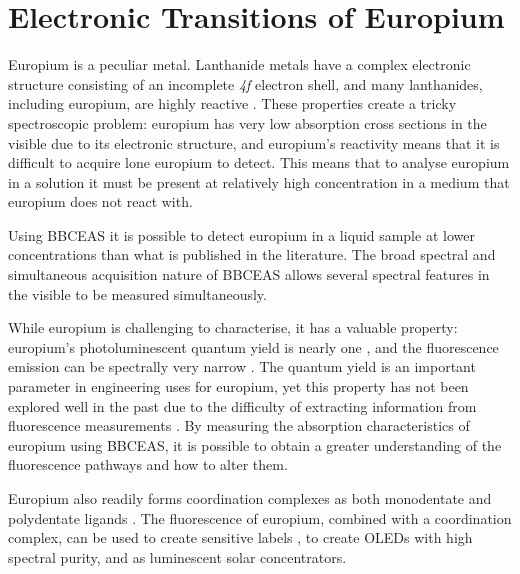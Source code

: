 \chapter{Electronic Transitions of Europium}\label{ch:eu_theory}

Europium is a peculiar metal. Lanthanide metals have a complex
electronic structure consisting of an incomplete \textsl{4f} electron
shell, and many lanthanides, including europium, are highly reactive
\cite{Cooley:1946tv,Rard:1985tb}. These properties create a tricky
spectroscopic problem: europium has very low absorption cross sections in the
visible due to its electronic structure, and europium's reactivity means that
it is difficult to acquire lone europium to detect. This means that to analyse
europium in a solution it must be present at relatively high concentration in
a medium that europium does not react with.


Using \ac{BBCEAS} it is possible to detect europium in a liquid sample at lower
concentrations than what is published in the literature.  The broad spectral
and simultaneous acquisition nature of \ac{BBCEAS} allows several spectral
features in the visible to be measured simultaneously.

While europium is challenging to characterise, it has a valuable
property: europium's photoluminescent quantum yield is nearly one
\cite{Scotognella:2009jo,Moudam:2009in, Bunzli:2005ic}, and the fluorescence
emission can be spectrally very narrow \cite{Werts:2002fs}. The quantum yield
is an important parameter in engineering uses for europium, yet this property
has not been explored well in the past due to the difficulty of extracting
information from fluorescence measurements \cite{Werts:2002fs}. By measuring
the absorption characteristics of europium using \ac{BBCEAS}, it is possible to
obtain a greater understanding of the fluorescence pathways and how to alter
them.

Europium also readily forms coordination complexes as both monodentate and
polydentate ligands
\cite{Kirby:1983cl,Sveshnikova:2000cr,Werts:2002fs,Bunzli:2005ic,Scotognella:2009jo,Moudam:2009in}. The fluorescence of europium, combined with a coordination complex, can be used
to create sensitive labels
\cite{Harma:2010dm,Pihlasalo:2010el,InstituteofBiomedicine:2011vt,Pihlasalo:2011ju,Pihlasalo:2012cq,Pihlasalo:2012en},
to create OLEDs with high spectral purity\cite{Moudam:2009in}, and as
luminescent solar concentrators\cite{Moudam:2009in,Wilson:2010hs}.

